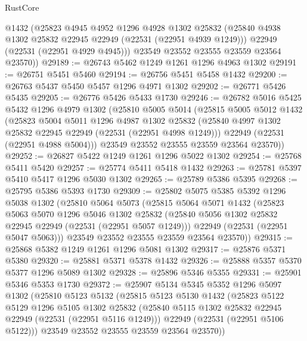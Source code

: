 \begin{lexlean}{RustCore}
\begin{coremodule}
        @1432
        (@25823
          @4945
          @4952
          @1296
          @4928
          @1302
          @25832
          (@25840 @4938 @1302 @25832 @22945 @22949 (@22531 (@22951 @4939 @1249)))
          @22949
          (@22531 (@22951 @4929 @4945)))
        @23549
        @23552
        @23555
        @23559
        @23564
        @23570))
@29189 := @26743 @5462 @1249 @1261 @1296 @4963 @1302
@29191 := @26751 @5451 @5460
@29194 := @26756 @5451 @5458 @1432
@29200 := @26763 @5437 @5450 @5457 @1296 @4971 @1302
@29202 := @26771 @5426 @5435
@29205 := @26776 @5426 @5433 @1730
@29246 := @26782
    @5016
    @5425
    @5432
    @1296
    @4979
    @1302
    (@25810
      @5005
      @5014
      (@25815
        @5005
        @5012
        @1432
        (@25823
          @5004
          @5011
          @1296
          @4987
          @1302
          @25832
          (@25840 @4997 @1302 @25832 @22945 @22949 (@22531 (@22951 @4998 @1249)))
          @22949
          (@22531 (@22951 @4988 @5004)))
        @23549
        @23552
        @23555
        @23559
        @23564
        @23570))
@29252 := @26827 @5422 @1249 @1261 @1296 @5022 @1302
@29254 := @25768 @5411 @5420
@29257 := @25774 @5411 @5418 @1432
@29263 := @25781 @5397 @5410 @5417 @1296 @5030 @1302
@29265 := @25789 @5386 @5395
@29268 := @25795 @5386 @5393 @1730
@29309 := @25802
    @5075
    @5385
    @5392
    @1296
    @5038
    @1302
    (@25810
      @5064
      @5073
      (@25815
        @5064
        @5071
        @1432
        (@25823
          @5063
          @5070
          @1296
          @5046
          @1302
          @25832
          (@25840 @5056 @1302 @25832 @22945 @22949 (@22531 (@22951 @5057 @1249)))
          @22949
          (@22531 (@22951 @5047 @5063)))
        @23549
        @23552
        @23555
        @23559
        @23564
        @23570))
@29315 := @25868 @5382 @1249 @1261 @1296 @5081 @1302
@29317 := @25876 @5371 @5380
@29320 := @25881 @5371 @5378 @1432
@29326 := @25888 @5357 @5370 @5377 @1296 @5089 @1302
@29328 := @25896 @5346 @5355
@29331 := @25901 @5346 @5353 @1730
@29372 := @25907
    @5134
    @5345
    @5352
    @1296
    @5097
    @1302
    (@25810
      @5123
      @5132
      (@25815
        @5123
        @5130
        @1432
        (@25823
          @5122
          @5129
          @1296
          @5105
          @1302
          @25832
          (@25840 @5115 @1302 @25832 @22945 @22949 (@22531 (@22951 @5116 @1249)))
          @22949
          (@22531 (@22951 @5106 @5122)))
        @23549
        @23552
        @23555
        @23559
        @23564
        @23570))

\end{coremodule}
\end{lexlean}
